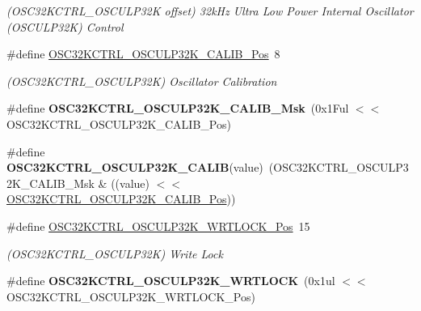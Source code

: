 \begin{DoxyCompactItemize}
\begin{DoxyCompactList}\small\item\em (O\+S\+C32\+K\+C\+T\+R\+L\+\_\+\+O\+S\+C\+U\+L\+P32\+K offset) 32k\+Hz Ultra Low Power Internal Oscillator (O\+S\+C\+U\+L\+P32\+K) Control \end{DoxyCompactList}\item 
\hypertarget{group___s_a_m_l21___o_s_c32_k_c_t_r_l_gaa2abedc94425667d08d6682c2c4f19cf}{}\#define \hyperlink{group___s_a_m_l21___o_s_c32_k_c_t_r_l_gaa2abedc94425667d08d6682c2c4f19cf}{O\+S\+C32\+K\+C\+T\+R\+L\+\_\+\+O\+S\+C\+U\+L\+P32\+K\+\_\+\+C\+A\+L\+I\+B\+\_\+\+Pos}~8\label{group___s_a_m_l21___o_s_c32_k_c_t_r_l_gaa2abedc94425667d08d6682c2c4f19cf}

\begin{DoxyCompactList}\small\item\em (O\+S\+C32\+K\+C\+T\+R\+L\+\_\+\+O\+S\+C\+U\+L\+P32\+K) Oscillator Calibration \end{DoxyCompactList}\item 
\hypertarget{group___s_a_m_l21___o_s_c32_k_c_t_r_l_ga032ec879eb215f0dce18a67a9507c2c6}{}\#define {\bfseries O\+S\+C32\+K\+C\+T\+R\+L\+\_\+\+O\+S\+C\+U\+L\+P32\+K\+\_\+\+C\+A\+L\+I\+B\+\_\+\+Msk}~(0x1\+Ful $<$$<$ O\+S\+C32\+K\+C\+T\+R\+L\+\_\+\+O\+S\+C\+U\+L\+P32\+K\+\_\+\+C\+A\+L\+I\+B\+\_\+\+Pos)\label{group___s_a_m_l21___o_s_c32_k_c_t_r_l_ga032ec879eb215f0dce18a67a9507c2c6}

\item 
\hypertarget{group___s_a_m_l21___o_s_c32_k_c_t_r_l_gaa82a019f33f0dcaa43f1076cf19b1839}{}\#define {\bfseries O\+S\+C32\+K\+C\+T\+R\+L\+\_\+\+O\+S\+C\+U\+L\+P32\+K\+\_\+\+C\+A\+L\+I\+B}(value)~(O\+S\+C32\+K\+C\+T\+R\+L\+\_\+\+O\+S\+C\+U\+L\+P32\+K\+\_\+\+C\+A\+L\+I\+B\+\_\+\+Msk \& ((value) $<$$<$ \hyperlink{group___s_a_m_l21___o_s_c32_k_c_t_r_l_gaa2abedc94425667d08d6682c2c4f19cf}{O\+S\+C32\+K\+C\+T\+R\+L\+\_\+\+O\+S\+C\+U\+L\+P32\+K\+\_\+\+C\+A\+L\+I\+B\+\_\+\+Pos}))\label{group___s_a_m_l21___o_s_c32_k_c_t_r_l_gaa82a019f33f0dcaa43f1076cf19b1839}

\item 
\hypertarget{group___s_a_m_l21___o_s_c32_k_c_t_r_l_ga591a0a2ca06e742e29fcac7418e0593f}{}\#define \hyperlink{group___s_a_m_l21___o_s_c32_k_c_t_r_l_ga591a0a2ca06e742e29fcac7418e0593f}{O\+S\+C32\+K\+C\+T\+R\+L\+\_\+\+O\+S\+C\+U\+L\+P32\+K\+\_\+\+W\+R\+T\+L\+O\+C\+K\+\_\+\+Pos}~15\label{group___s_a_m_l21___o_s_c32_k_c_t_r_l_ga591a0a2ca06e742e29fcac7418e0593f}

\begin{DoxyCompactList}\small\item\em (O\+S\+C32\+K\+C\+T\+R\+L\+\_\+\+O\+S\+C\+U\+L\+P32\+K) Write Lock \end{DoxyCompactList}\item 
\hypertarget{group___s_a_m_l21___o_s_c32_k_c_t_r_l_ga03e99d5691394be1b3b2b55d1b422a7c}{}\#define {\bfseries O\+S\+C32\+K\+C\+T\+R\+L\+\_\+\+O\+S\+C\+U\+L\+P32\+K\+\_\+\+W\+R\+T\+L\+O\+C\+K}~(0x1ul $<$$<$ O\+S\+C32\+K\+C\+T\+R\+L\+\_\+\+O\+S\+C\+U\+L\+P32\+K\+\_\+\+W\+R\+T\+L\+O\+C\+K\+\_\+\+Pos)\label{group___s_a_m_l21___o_s_c32_k_c_t_r_l_ga03e99d5691394be1b3b2b55d1b422a7c}


\end{DoxyCompactItemize}
